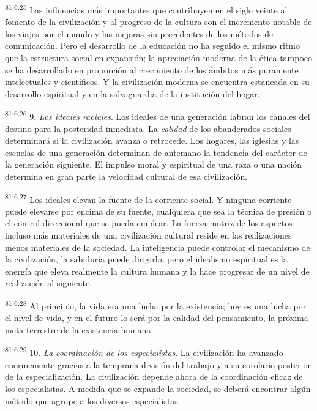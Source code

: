 \par
\textsuperscript{81:6.25} Las influencias más importantes que contribuyen en el siglo veinte al fomento de la civilización y al progreso de la cultura son el incremento notable de los viajes por el mundo y las mejoras sin precedentes de los métodos de comunicación. Pero el desarrollo de la educación no ha seguido el mismo ritmo que la estructura social en expansión; la apreciación moderna de la ética tampoco se ha desarrollado en proporción al crecimiento de los ámbitos más puramente intelectuales y científicos. Y la civilización moderna se encuentra estancada en su desarrollo espiritual y en la salvaguardia de la institución del hogar.

\par
\textsuperscript{81:6.26} 9. \textit{Los ideales raciales}. Los ideales de una generación labran los canales del destino para la posteridad inmediata. La \textit{calidad} de los abanderados sociales determinará si la civilización avanza o retrocede. Los hogares, las iglesias y las escuelas de una generación determinan de antemano la tendencia del carácter de la generación siguiente. El impulso moral y espiritual de una raza o una nación determina en gran parte la velocidad cultural de esa civilización.

\par
\textsuperscript{81:6.27} Los ideales elevan la fuente de la corriente social. Y ninguna corriente puede elevarse por encima de su fuente, cualquiera que sea la técnica de presión o el control direccional que se pueda emplear. La fuerza motriz de los aspectos incluso más materiales de una civilización cultural reside en las realizaciones menos materiales de la sociedad. La inteligencia puede controlar el mecanismo de la civilización, la sabiduría puede dirigirlo, pero el idealismo espiritual es la energía que eleva realmente la cultura humana y la hace progresar de un nivel de realización al siguiente.

\par
\textsuperscript{81:6.28} Al principio, la vida era una lucha por la existencia; hoy es una lucha por el nivel de vida, y en el futuro lo será por la calidad del pensamiento, la próxima meta terrestre de la existencia humana.

\par
\textsuperscript{81:6.29} 10. \textit{La coordinación de los especialistas}. La civilización ha avanzado enormemente gracias a la temprana división del trabajo y a su corolario posterior de la especialización. La civilización depende ahora de la coordinación eficaz de los especialistas. A medida que se expande la sociedad, se deberá encontrar algún método que agrupe a los diversos especialistas.

